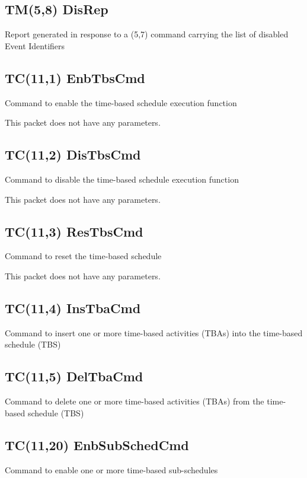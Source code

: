 \pagebreak
\subsection{TM(5,8) DisRep}
Report generated in response to a (5,7) command carrying the list of disabled Event Identifiers

\pagebreak
\subsection{TC(11,1) EnbTbsCmd}
Command to enable the time-based schedule execution function

This packet does not have any parameters.

\pagebreak
\subsection{TC(11,2) DisTbsCmd}
Command to disable the time-based schedule execution function

This packet does not have any parameters.

\pagebreak
\subsection{TC(11,3) ResTbsCmd}
Command to reset the time-based schedule

This packet does not have any parameters.

\pagebreak
\subsection{TC(11,4) InsTbaCmd}
Command to insert one or more time-based activities (TBAs) into the time-based schedule (TBS)

\pagebreak
\subsection{TC(11,5) DelTbaCmd}
Command to delete one or more time-based activities (TBAs) from the time-based schedule (TBS)

\pagebreak
\subsection{TC(11,20) EnbSubSchedCmd}
Command to enable one or more time-based sub-schedules

